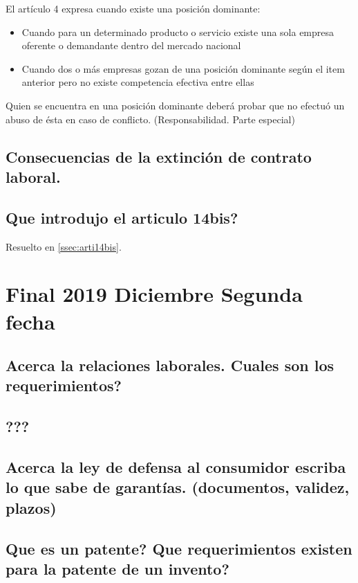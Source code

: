 \documentclass{article}
\begin{document}
El art\'iculo 4 expresa cuando existe una posición dominante:

\begin{itemize}
	\item Cuando para un determinado producto o servicio existe una sola empresa oferente o demandante dentro del mercado nacional
	\item Cuando dos o m\'as empresas gozan de una posición dominante seg\'un el item anterior pero no existe competencia efectiva entre ellas
\end{itemize} 

Quien se encuentra en una posición dominante deberá probar que no efectuó un abuso de \'esta en caso de conflicto. (Responsabilidad. Parte especial)

\subsection{Consecuencias de la extinci\'on de contrato laboral.}



\subsection{Que introdujo el articulo 14bis?}
Resuelto en \ref{ssec:arti14bis}.

\section{Final 2019 Diciembre Segunda fecha}
\subsection{Acerca la relaciones laborales. Cuales son los requerimientos?}

\subsection{???}

\subsection{Acerca la ley de defensa al consumidor escriba lo que sabe de garantías. (documentos, validez, plazos)}

\subsection{Que es un patente? Que requerimientos existen para la patente de un invento?}
\end{document}
